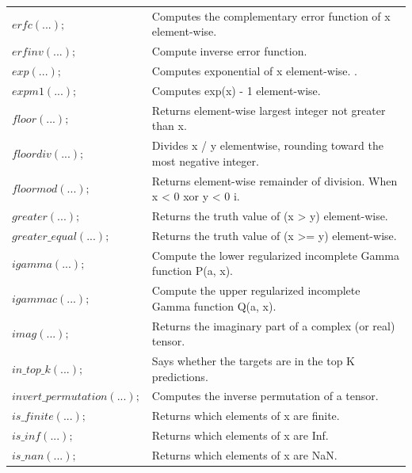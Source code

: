 \documentclass[12pt]{report}
\begin{document}
\begin{longtable}{ p{} | p{}}
$erfc(...);$ & Computes the complementary error function of x element-wise. \\ 

$erfinv(...);$ & Compute inverse error function. \\ 

$exp(...);$ & Computes exponential of x element-wise. . \\ 

$expm1(...);$ & Computes exp(x) - 1 element-wise. \\ 

$floor(...);$ & Returns element-wise largest integer not greater than x. \\ 

$floordiv(...);$ & Divides x / y elementwise, rounding toward the most negative integer. \\ 

$floormod(...);$ & Returns element-wise remainder of division. When x < 0 xor y < 0 i. \\ 

$greater(...);$ & Returns the truth value of (x > y) element-wise. \\ 

$greater\_equal(...);$ & Returns the truth value of (x >= y) element-wise. \\ 

$igamma(...);$ & Compute the lower regularized incomplete Gamma function P(a, x). \\ 

$igammac(...);$ & Compute the upper regularized incomplete Gamma function Q(a, x). \\ 

$imag(...);$ & Returns the imaginary part of a complex (or real) tensor. \\ 

$in\_top\_k(...);$ & Says whether the targets are in the top K predictions. \\ 

$invert\_permutation(...);$ & Computes the inverse permutation of a tensor. \\ 

$is\_finite(...);$ & Returns which elements of x are finite. \\ 

$is\_inf(...);$ & Returns which elements of x are Inf. \\ 

$is\_nan(...);$ & Returns which elements of x are NaN. \\ 


\end{longtable}
\end{document}
